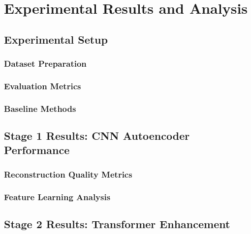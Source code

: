 
\chapter{Experimental Results and Analysis}

\section{Experimental Setup}

\subsection{Dataset Preparation}

\subsection{Evaluation Metrics}

\subsection{Baseline Methods}

\section{Stage 1 Results: CNN Autoencoder Performance}

\subsection{Reconstruction Quality Metrics}

\subsection{Feature Learning Analysis}

\section{Stage 2 Results: Transformer Enhancement}

